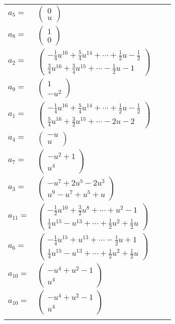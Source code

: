 \documentclass[1p]{elsarticle_modified}
\theoremstyle{definition}
\begin{document}
\begin{tabular}{m{7pt} m{180pt} m{7pt} m{180pt} }
\flushright $a_{5}=$&$\begin{pmatrix}0\\u\end{pmatrix}$ \\
\flushright $a_{8}=$&$\begin{pmatrix}1\\0\end{pmatrix}$ \\
\flushright $a_{2}=$&$\begin{pmatrix}-\frac{1}{4} u^{16}+\frac{5}{4} u^{14}+\cdots+\frac{1}{2} u-\frac{1}{2}\\\frac{3}{4} u^{16}+\frac{3}{4} u^{15}+\cdots-\frac{1}{2} u-1\end{pmatrix}$ \\
\flushright $a_{9}=$&$\begin{pmatrix}1\\- u^2\end{pmatrix}$ \\
\flushright $a_{1}=$&$\begin{pmatrix}-\frac{1}{4} u^{16}+\frac{5}{4} u^{14}+\cdots+\frac{1}{2} u-\frac{1}{2}\\\frac{5}{4} u^{16}+\frac{3}{2} u^{15}+\cdots-2 u-2\end{pmatrix}$ \\
\flushright $a_{4}=$&$\begin{pmatrix}- u\\u\end{pmatrix}$ \\
\flushright $a_{7}=$&$\begin{pmatrix}- u^2+1\\u^4\end{pmatrix}$ \\
\flushright $a_{3}=$&$\begin{pmatrix}- u^7+2 u^5-2 u^3\\u^9- u^7+u^5+u\end{pmatrix}$ \\
\flushright $a_{11}=$&$\begin{pmatrix}-\frac{1}{2} u^{10}+\frac{3}{2} u^8+\cdots+u^2-1\\\frac{1}{4} u^{15}- u^{13}+\cdots+\frac{1}{2} u^2+\frac{1}{2} u\end{pmatrix}$ \\
\flushright $a_{6}=$&$\begin{pmatrix}-\frac{1}{4} u^{15}+u^{13}+\cdots-\frac{1}{2} u+1\\\frac{1}{4} u^{15}- u^{13}+\cdots+\frac{1}{2} u^2+\frac{1}{2} u\end{pmatrix}$ \\
\flushright $a_{10}=$&$\begin{pmatrix}- u^4+u^2-1\\u^4\end{pmatrix}$\\ \flushright $a_{10}=$&$\begin{pmatrix}- u^4+u^2-1\\u^4\end{pmatrix}$\\&\end{tabular}
\end{document}
